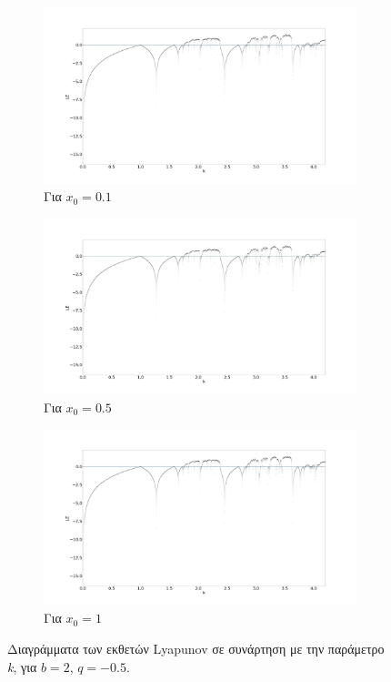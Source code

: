\begin{figure}[ht]
	\centering
	
	\begin{subfigure}[b]{0.8\textwidth}
		\centering
		\includegraphics[width=\textwidth]{LateX images/sine q=-0.5/g8}
		\caption{Για \(x_0=0.1\)}
		\label{f:g49}
	\end{subfigure}
	\hfill
	\begin{subfigure}[b]{0.8\textwidth}
		\centering
		\includegraphics[width=\textwidth]{LateX images/sine q=-0.5/g9}
		\caption{Για \(x_0=0.5\)}
		\label{f:g50}
	\end{subfigure}
	\hfill
	\begin{subfigure}[b]{0.8\textwidth}
		\centering
		\includegraphics[width=\textwidth]{LateX images/sine q=-0.5/g10}
		\caption{Για \(x_0=1\)}
		\label{f:g51}
	\end{subfigure}
	\hfill
	\caption{ Διαγράμματα των εκθετών Lyapunov σε συνάρτηση με την παράμετρο \emph{k}, για $b = 2$, $q=-0.5$.}
	\label{f:g236}
\end{figure}


